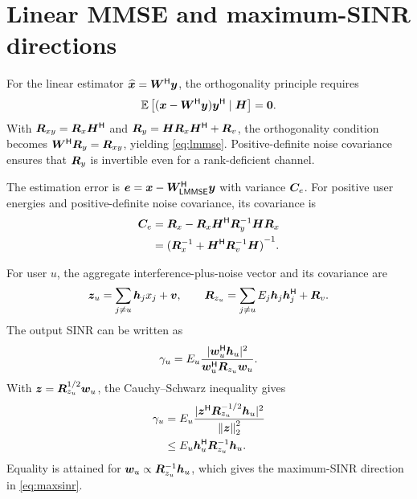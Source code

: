 \clearpage

\section{Linear MMSE and maximum-SINR directions}
\label{app:lmmse}
For the linear estimator $\widehat{\bm{x}}={\bm{W}}^{\mathsf{H}}\bm{y}$, the orthogonality principle requires
\begin{equation}
	\mathbb{E}\left[(\bm{x}-{\bm{W}}^{\mathsf{H}}\bm{y}){\bm{y}}^{\mathsf{H}}\mid\bm{H}\right]=\bm{0}.
\end{equation}
With $\bm{R}_{xy}=\bm{R}_x{\bm{H}}^{\mathsf{H}}$ and $\bm{R}_y=\bm{H}\bm{R}_x{\bm{H}}^{\mathsf{H}}+\bm{R}_v$, the orthogonality condition becomes ${\bm{W}}^{\mathsf{H}}\bm{R}_y=\bm{R}_{xy}$, yielding \eqref{eq:lmmse}. Positive-definite noise covariance ensures that $\bm{R}_y$ is invertible even for a rank-deficient channel.

The estimation error is  $\bm{e}=\bm{x}-{\bm{W}}^{\mathsf{H}}_{\mathsf{LMMSE}}\bm{y}$ with variance $\bm{C}_e$. For positive user energies and positive-definite noise covariance, its covariance is
\begin{equation}
	\begin{split}
		\bm{C}_e
		&=\bm{R}_x-\bm{R}_x{\bm{H}}^{\mathsf{H}}{\bm{R}}^{-1}_y\bm{H}\bm{R}_x\\
		&={({\bm{R}}^{-1}_x+{\bm{H}}^{\mathsf{H}}{\bm{R}}^{-1}_v\bm{H})}^{-1}.
	\end{split}
	\label{eq:lmmse-error}
\end{equation}

For user $u$, the aggregate interference-plus-noise vector and its covariance are
\begin{equation}
	\bm{z}_u=\sum_{j\ne u}\bm{h}_jx_j+\bm{v},
	\qquad
	\bm{R}_{z_u}=\sum_{j\ne u}E_j\bm{h}_j{\bm{h}}^{\mathsf{H}}_j+\bm{R}_v.
\end{equation}
The output SINR can be written as
\begin{equation}
	\gamma_u=E_u\frac{|{\bm{w}}^{\mathsf{H}}_u\bm{h}_u|^2}
	{{\bm{w}}^{\mathsf{H}}_u\bm{R}_{z_u}\bm{w}_u}.
\end{equation}
With $\bm{z}=\bm{R}_{z_u}^{1/2}\bm{w}_u$, the Cauchy--Schwarz inequality gives
\begin{equation}
	\begin{split}
		\gamma_u
		&=E_u\frac{|{\bm{z}}^{\mathsf{H}}\bm{R}_{z_u}^{-1/2}\bm{h}_u|^2}
		{\left\|\bm{z}\right\|_2^2}\\
		&\leq E_u{\bm{h}}^{\mathsf{H}}_u{\bm{R}}^{-1}_{z_u}\bm{h}_u.
	\end{split}
\end{equation}
Equality is attained for $\bm{w}_u\propto{\bm{R}}^{-1}_{z_u}\bm{h}_u$, which gives the maximum-SINR direction in \eqref{eq:maxsinr}.

